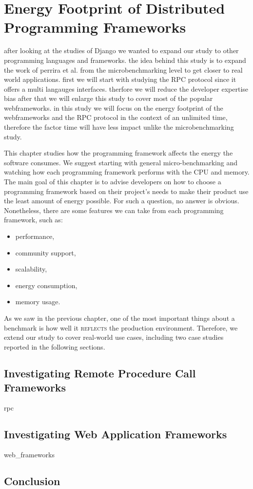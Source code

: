 \chapter{Energy Footprint of Distributed Programming Frameworks}
\label{chapter:porgramming_langauges}


after looking at the studies of Django we wanted to expand our study to other programming languages and frameworks.
the idea behind this study is to expand the work of perrira et al. from the microbenchmarking level to get closer to real world applications.
first we will start with studying the RPC protocol since it offers a multi langauges interfaces. therfore we will reduce the developer expertise bias 
after that we will enlarge this study to cover most of the popular webframeworks. in this study we will focus on the energy footprint of the webframeworks and the RPC protocol in the context of an unlimited time, therefore the factor time will have less impact unlike the microbenchmarking study. 

This chapter studies how the programming framework affects the energy the software consumes.
We suggest starting with general micro-benchmarking and watching how each programming framework performs with the CPU and memory.
The main goal of this chapter is to advise developers on how to choose a programming framework based on their project's needs to make their product use the least amount of energy possible.
For such a question, no answer is obvious.
Nonetheless, there are some features we can take from each programming framework, such as:
\begin{itemize}
    \item performance,
    \item community support,
    \item scalability,
    \item energy consumption,
    \item memory usage.
\end{itemize}

As we saw in the previous chapter, one of the most important things about a benchmark is how well it \textsc{reflects} the production environment.
Therefore, we extend our study to cover real-world use cases, including two case studies reported in the following sections.

\section{Investigating Remote Procedure Call Frameworks}
{rpc}


\section{Investigating Web Application Frameworks}
{web_frameworks}

\section{Conclusion }
